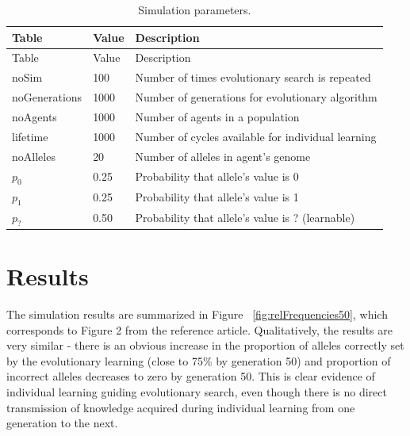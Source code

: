 \documentclass[10pt,a4paper,onecolumn]{article}
\begin{document}
\hypertarget{tbl:parameters}{}
\begin{longtable}[]{@{}lll@{}}
\caption{\label{tbl:parameters}Simulation parameters. }\tabularnewline
\toprule
Table & Value & Description\tabularnewline
\midrule
\endfirsthead
\toprule
Table & Value & Description\tabularnewline
\midrule
\endhead
noSim & 100 & Number of times evolutionary search is
repeated\tabularnewline
noGenerations & 1000 & Number of generations for evolutionary
algorithm\tabularnewline
noAgents & 1000 & Number of agents in a population\tabularnewline
lifetime & 1000 & Number of cycles available for individual
learning\tabularnewline
noAlleles & 20 & Number of alleles in agent's genome\tabularnewline
\(p_0\) & 0.25 & Probability that allele's value is 0\tabularnewline
\(p_1\) & 0.25 & Probability that allele's value is 1\tabularnewline
\(p_?\) & 0.50 & Probability that allele's value is ?
(learnable)\tabularnewline
\bottomrule
\end{longtable}

\section{Results}\label{results}

The simulation results are summarized in Figure
~\ref{fig:relFrequencies50}, which corresponds to Figure 2 from the
reference article. Qualitatively, the results are very similar - there
is an obvious increase in the proportion of alleles correctly set by the
evolutionary learning (close to 75\% by generation 50) and proportion of
incorrect alleles decreases to zero by generation 50. This is clear
evidence of individual learning guiding evolutionary search, even though
there is no direct transmission of knowledge acquired during individual
learning from one generation to the next.
\end{document}
